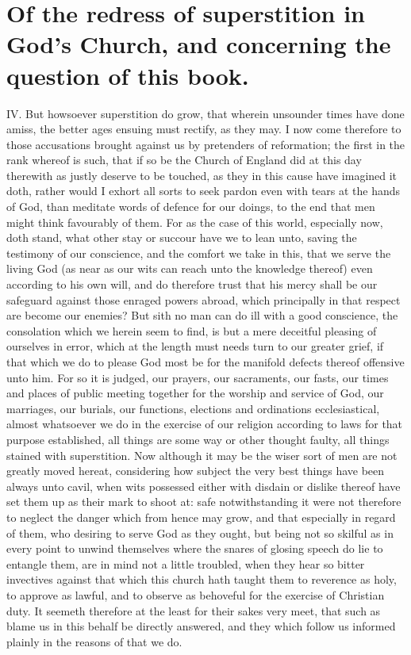 \section*{Of the redress of superstition in God’s Church, and concerning the question of this book.}
IV. But howsoever superstition do grow, that wherein unsounder times have done amiss, the better ages ensuing must rectify, as they may. I now come therefore to those accusations brought against us by pretenders of reformation; the first in the rank whereof is such, that if so be the Church of England did at this day therewith as justly deserve to be touched, as they in this cause have imagined it doth, rather would I exhort all sorts to seek pardon even with tears at the hands of God, than meditate words of defence for our doings, to the end that men might think favourably of them. For as the case of this world, especially now, doth stand, what other stay or succour have we to lean unto, saving the testimony of our conscience, and the comfort we take in this, that we serve the living God (as near as our wits can reach unto the knowledge thereof) even according to his own will, and do therefore trust that his mercy shall be our safeguard against those enraged powers abroad, which principally in that respect are become our enemies? But sith no man can do ill with a good conscience, the consolation which we herein seem to find, is but a mere deceitful pleasing of ourselves in error, which at the length must needs turn to our greater grief, if that which we do to please God most be for the manifold defects thereof offensive unto him. For so it is judged, our prayers, our sacraments, our fasts, our times and places of public meeting together for the worship and service of God, our marriages, our burials, our functions, elections and ordinations ecclesiastical, almost whatsoever we do in the exercise of our religion according to laws for that purpose established, all things are some way or other thought faulty, all things stained with superstition.
Now although it may be the wiser sort of men are not greatly moved hereat, considering how subject the very best things have been always unto cavil, when wits possessed either with disdain or dislike thereof have set them up as their mark to shoot at: safe notwithstanding it were not therefore to  neglect the danger which from hence may grow, and that especially in regard of them, who desiring to serve God as they ought, but being not so skilful as in every point to unwind themselves where the snares of glosing speech do lie to entangle them, are in mind not a little troubled, when they hear so bitter invectives against that which this church hath taught them to reverence as holy, to approve as lawful, and to observe as behoveful for the exercise of Christian duty. It seemeth therefore at the least for their sakes very meet, that such as blame us in this behalf be directly answered, and they which follow us informed plainly in the reasons of that we do.
